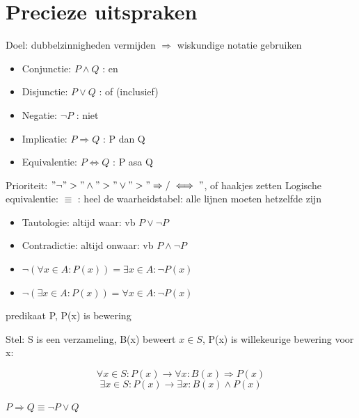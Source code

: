 \documentclass{article}
\begin{document}
\section{Precieze uitspraken}
Doel: dubbelzinnigheden vermijden $\Rightarrow$ wiskundige notatie gebruiken
\begin{itemize}
    \item Conjunctie: $P \land Q$ : en
    \item Disjunctie: $P \lor Q$ : of (inclusief)
    \item Negatie: $\neg P$ : niet
    \item Implicatie: $P \Rightarrow Q$ : P dan Q
    \item Equivalentie: $P \iff Q$ : P asa Q
\end{itemize} 
Prioriteit: $"\neg" > "\land" > "\lor" > "\Rightarrow / \iff" $, of haakjes zetten \newline
Logische equivalentie: $\equiv$ : heel de waarheidstabel: alle lijnen moeten hetzelfde zijn
\begin{itemize}
    \item Tautologie: altijd waar: vb $P \lor \neg P$
    \item Contradictie: altijd onwaar: vb $P \land \neg P$
    \item $\neg (\forall x \in A: P(x)) = \exists x \in A: \neg P(x)$
    \item $\neg (\exists x \in A: P(x)) = \forall x \in A: \neg P(x)$
\end{itemize}
predikaat P, P(x) is bewering \newline

Stel: S is een verzameling, B(x) beweert $x \in S$, P(x) is willekeurige bewering voor x:

    \[\forall x \in S: P(x) \longrightarrow \forall x: B(x) \Rightarrow P(x)\]
    \[\exists x \in S: P(x) \longrightarrow \exists x: B(x) \land P(x)\]

$P \Rightarrow Q \equiv \neg P \lor Q$ \newline
\end{document}
